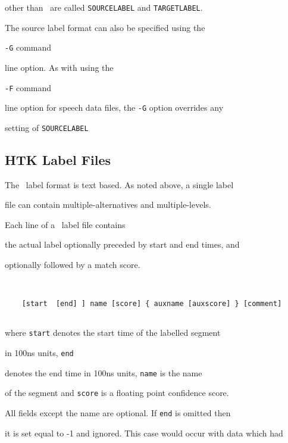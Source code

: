 other than \HTK\ are called \texttt{SOURCELABEL} and \texttt{TARGETLABEL}.


The source label format can also be specified using the 


\texttt{-G} command


line option.  As with using the 


\texttt{-F} command


line option for speech data files, the \texttt{-G} option overrides any


setting of \texttt{SOURCELABEL}





\subsection{HTK Label Files}





The \HTK\ label format is text based.  As noted above, a single label


file can contain multiple-alternatives and multiple-levels.





Each line of a \HTK\ label file contains


the actual label optionally preceded by start and end times, and


optionally followed by a match score.  


\begin{verbatim}


    [start  [end] ] name [score] { auxname [auxscore] } [comment]


\end{verbatim}


where \texttt{start} denotes the start time of the labelled segment


in 100ns units, \texttt{end}


denotes the end time in 100ns units,  \texttt{name} is the name


of the segment and \texttt{score} is a floating point confidence score.


All fields except the name are optional.  If \texttt{end} is omitted then


it is set equal to -1 and ignored.  This case would occur with data which had


